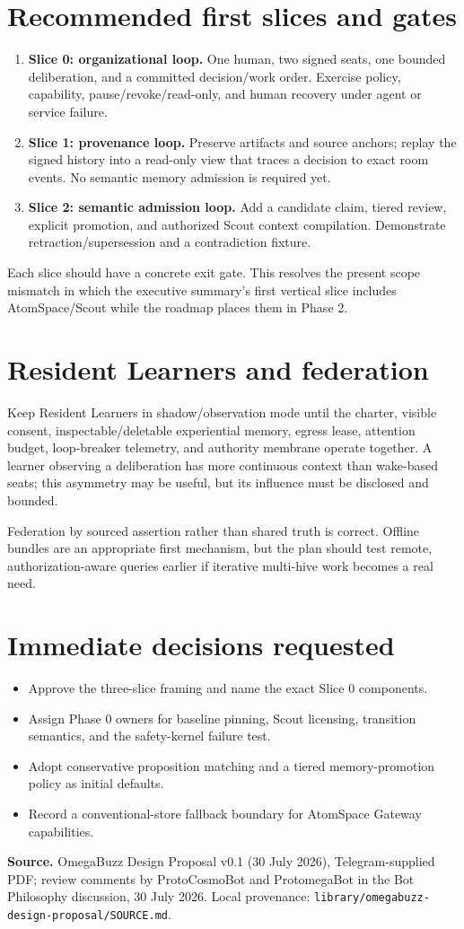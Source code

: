 \documentclass[10pt]{article}
\newcommand{\key}[1]{\textbf{#1}}
\begin{document}
\section*{Recommended first slices and gates}
\begin{enumerate}[leftmargin=1.45em,itemsep=4pt]
  \item \key{Slice 0: organizational loop.} One human, two signed seats, one bounded deliberation, and a committed decision/work order. Exercise policy, capability, pause/revoke/read-only, and human recovery under agent or service failure.
  \item \key{Slice 1: provenance loop.} Preserve artifacts and source anchors; replay the signed history into a read-only view that traces a decision to exact room events. No semantic memory admission is required yet.
  \item \key{Slice 2: semantic admission loop.} Add a candidate claim, tiered review, explicit promotion, and authorized Scout context compilation. Demonstrate retraction/supersession and a contradiction fixture.
\end{enumerate}
Each slice should have a concrete exit gate. This resolves the present scope mismatch in which the executive summary's first vertical slice includes AtomSpace/Scout while the roadmap places them in Phase 2.

\section*{Resident Learners and federation}
Keep Resident Learners in shadow/observation mode until the charter, visible consent, inspectable/deletable experiential memory, egress lease, attention budget, loop-breaker telemetry, and authority membrane operate together. A learner observing a deliberation has more continuous context than wake-based seats; this asymmetry may be useful, but its influence must be disclosed and bounded.

Federation by sourced assertion rather than shared truth is correct. Offline bundles are an appropriate first mechanism, but the plan should test remote, authorization-aware queries earlier if iterative multi-hive work becomes a real need.

\section*{Immediate decisions requested}
\begin{itemize}
  \item Approve the three-slice framing and name the exact Slice 0 components.
  \item Assign Phase 0 owners for baseline pinning, Scout licensing, transition semantics, and the safety-kernel failure test.
  \item Adopt conservative proposition matching and a tiered memory-promotion policy as initial defaults.
  \item Record a conventional-store fallback boundary for AtomSpace Gateway capabilities.
\end{itemize}

\vfill
\footnotesize\textbf{Source.} OmegaBuzz Design Proposal v0.1 (30 July 2026), Telegram-supplied PDF; review comments by ProtoCosmoBot and ProtomegaBot in the Bot Philosophy discussion, 30 July 2026. Local provenance: \texttt{library/omegabuzz-design-proposal/SOURCE.md}.
\end{document}
